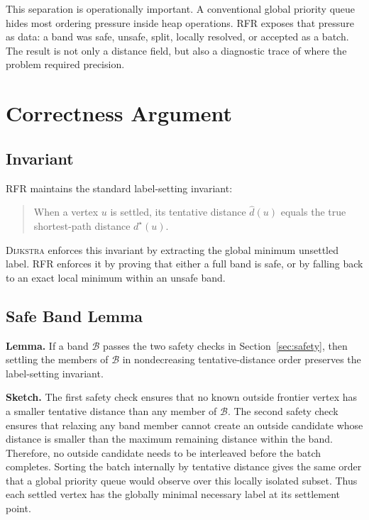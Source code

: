 \documentclass[11pt]{article}
\newcommand{\RFR}{\textsc{RFR}}
\newcommand{\Dijkstra}{\textsc{Dijkstra}}
\newcommand{\band}{\mathcal{B}}
\begin{document}
This separation is operationally important. A conventional global priority queue hides most ordering pressure inside heap operations. \RFR{} exposes that pressure as data: a band was safe, unsafe, split, locally resolved, or accepted as a batch. The result is not only a distance field, but also a diagnostic trace of where the problem required precision.

\section{Correctness Argument}
\label{sec:correctness}

\subsection{Invariant}

\RFR{} maintains the standard label-setting invariant:

\begin{quote}
When a vertex $u$ is settled, its tentative distance $\hat d(u)$ equals the true shortest-path distance $d^\star(u)$.
\end{quote}

\Dijkstra{} enforces this invariant by extracting the global minimum unsettled label. \RFR{} enforces it by proving that either a full band is safe, or by falling back to an exact local minimum within an unsafe band.

\subsection{Safe Band Lemma}

\textbf{Lemma.} If a band $\band$ passes the two safety checks in Section~\ref{sec:safety}, then settling the members of $\band$ in nondecreasing tentative-distance order preserves the label-setting invariant.

\textbf{Sketch.} The first safety check ensures that no known outside frontier vertex has a smaller tentative distance than any member of $\band$. The second safety check ensures that relaxing any band member cannot create an outside candidate whose distance is smaller than the maximum remaining distance within the band. Therefore, no outside candidate needs to be interleaved before the batch completes. Sorting the batch internally by tentative distance gives the same order that a global priority queue would observe over this locally isolated subset. Thus each settled vertex has the globally minimal necessary label at its settlement point.
\end{document}
